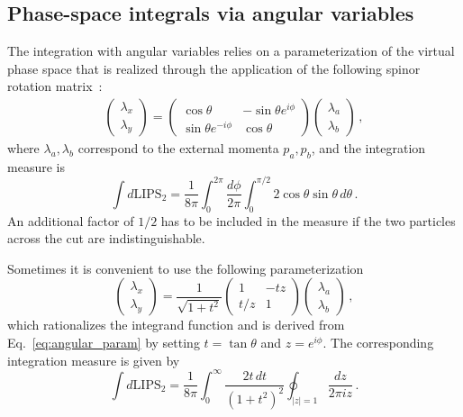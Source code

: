 \subsection{Phase-space integrals via angular variables}
\label{sec:phasespace_Angular}

The integration with angular variables relies on a parameterization of the virtual phase space
that is realized through the application of the following spinor rotation matrix~\cite{Zwiebel:2011bx}:
\begin{eqnarray}\label{eq:angular_param}
    \begin{pmatrix}
 \lambda_x \\
 \lambda_y
    \end{pmatrix}
     = 
    \begin{pmatrix}
 \cos\theta & -\sin\theta e^{i\phi} \\ 
 \sin\theta e^{-i\phi} & \cos\theta
\end{pmatrix}
\begin{pmatrix}
 \lambda_{a} \\
 \lambda_{b}
    \end{pmatrix}\,,
\end{eqnarray}
where $ \lambda_{a},\lambda_{b}$ correspond to the external momenta $p_a,p_b$,
and the integration measure is 
\begin{equation}
    \int d\text{LIPS}_2= \frac{1}{8 \pi}\int_0^{2 \pi} \frac{d\phi}{2\pi}\int_0^{\pi/2} 2 \cos\theta \sin\theta \, d\theta  \, . 
\end{equation}
%
An additional factor of $1/2$ has to be included in the measure if the two particles across the cut are indistinguishable.

%
Sometimes it is convenient to use the following parameterization
%
\begin{equation}
    \begin{pmatrix}
        \lambda_x \\ \lambda_y
    \end{pmatrix}
    =
    \frac{1}{\sqrt{1+t^2}}
    \begin{pmatrix}
        1 & -tz \\
        t/z & 1
    \end{pmatrix}
    \begin{pmatrix}
        \lambda_a \\ \lambda_b
    \end{pmatrix}\,,
\end{equation}
%
which rationalizes the integrand function and is derived from Eq.~\eqref{eq:angular_param} by setting $t=\tan\theta$ and $z=e^{i\phi}$.
The corresponding integration measure is given by
\begin{equation}
\label{eq:hybbrid}
    \int d\text{LIPS}_2 = \frac{1}{8\pi}\int_0^\infty \frac{2t \, dt}{(1+t^2)^2}\oint_{|z|=1}\frac{dz}{2\pi i z}\,.
\end{equation}


